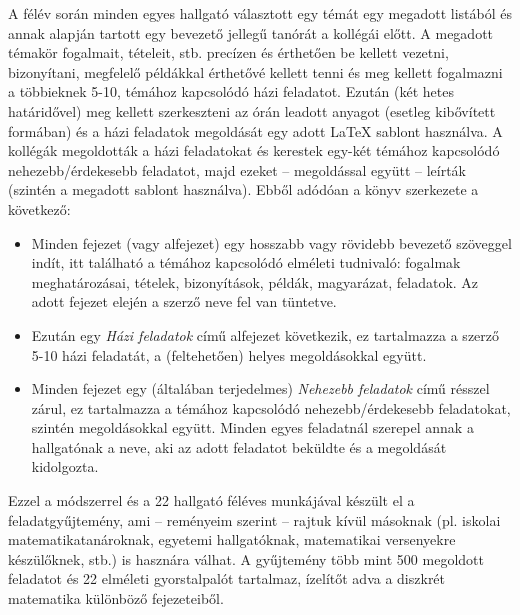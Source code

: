 \documentclass[magyar]{package/fancy-book}
\begin{document}
A félév során minden egyes hallgató választott egy témát egy megadott
listából és annak alapján tartott egy bevezető jellegű tanórát a kollégái
előtt. A megadott témakör fogalmait, tételeit, stb. precízen és érthetően
be kellett vezetni, bizonyítani, megfelelő példákkal érthetővé kellett
tenni és meg kellett fogalmazni a többieknek 5-10, témához kapcsolódó
házi feladatot. Ezután (két hetes határidővel) meg kellett szerkeszteni
az órán leadott anyagot (esetleg kibővített formában) és a házi feladatok
megoldását egy adott \LaTeX{} sablont használva. A kollégák megoldották
a házi feladatokat és kerestek egy-két témához kapcsolódó nehezebb/érdekesebb
feladatot, majd ezeket -- megoldással együtt -- leírták (szintén
a megadott sablont használva). Ebből adódóan a könyv szerkezete a
következő: 
\begin{itemize}
	\item Minden fejezet (vagy alfejezet) egy hosszabb vagy rövidebb bevezető
	szöveggel indít, itt található a témához kapcsolódó elméleti tudnivaló:
	fogalmak meghatározásai, tételek, bizonyítások, példák, magyarázat,
	feladatok. Az adott fejezet elején a szerző neve fel van tüntetve. 
	\item Ezután egy \emph{Házi feladatok} című alfejezet következik, ez tartalmazza
	a szerző 5-10 házi feladatát, a (feltehetően) helyes megoldásokkal
	együtt. 
	\item Minden fejezet egy (általában terjedelmes) \emph{Nehezebb feladatok}
	című résszel zárul, ez tartalmazza a témához kapcsolódó nehezebb/érdekesebb
	feladatokat, szintén megoldásokkal együtt. Minden egyes feladatnál
	szerepel annak a hallgatónak a neve, aki az adott feladatot beküldte
	és a megoldását kidolgozta.
\end{itemize}
Ezzel a módszerrel és a 22 hallgató féléves munkájával készült el
a feladatgyűjtemény, ami -- reményeim szerint -- rajtuk kívül másoknak
(pl. iskolai matematikatanároknak, egyetemi hallgatóknak, matematikai
versenyekre készülőknek, stb.) is hasznára válhat. A gyűjtemény több
mint 500 megoldott feladatot és 22 elméleti gyorstalpalót tartalmaz,
ízelítőt adva a diszkrét matematika különböző fejezeteiből. 
\end{document}
